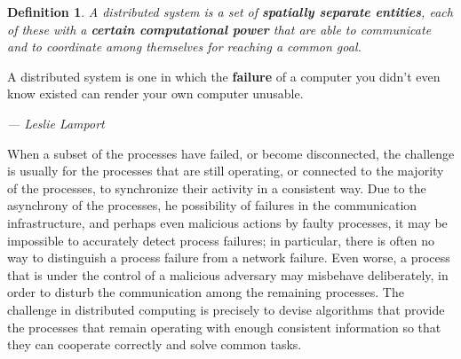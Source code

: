 \documentclass{book}
\newtheorem{definition}{Definition}
\begin{document}
\begin{definition}
    A distributed system is a set of \textbf{spatially separate entities}, each of these with a \textbf{certain computational power} that are able to communicate and to coordinate among themselves for reaching a common goal.\\
\end{definition}

\begin{tcolorbox}[colback=blue!5!white,colframe=blue!75!black,title=Leslie Lamport on Distributed Systems]
    A distributed system is one in which the \textbf{failure} of a computer you didn't even know existed can render your own computer unusable.
    \begin{flushright}
        \textit{--- Leslie Lamport}
    \end{flushright}
\end{tcolorbox}

When a subset of the processes have failed, or become disconnected, the challenge is usually for the processes that are still operating, or connected to the majority of the processes, to synchronize their activity in a consistent way.
\newline
Due to the asynchrony of the processes, he possibility of failures in the communication infrastructure, and perhaps even malicious actions by faulty processes, it may be impossible to accurately detect process failures; in particular, there is often no way to distinguish a process failure from a network failure.
\newline
Even worse, a process that is under the control of a malicious adversary may misbehave deliberately, in order to disturb the communication among the remaining processes.
The challenge in distributed computing is precisely to devise algorithms that provide the processes that remain operating with enough consistent information so that they can cooperate correctly and solve common tasks.
\end{document}
